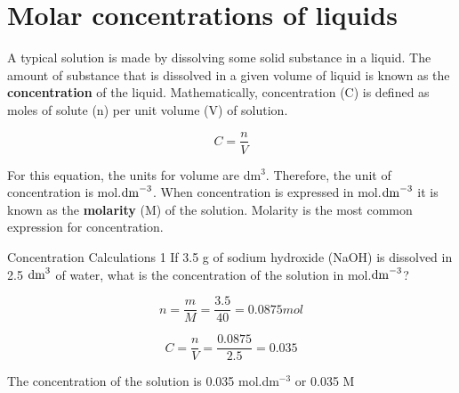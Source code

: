 



\section{Molar concentrations of liquids}
\label{sec:quant:liquids}


A typical solution is made by dissolving some solid substance in a liquid. The amount of substance that is dissolved in a given volume of liquid is known as the \textbf{concentration} of the liquid. Mathematically, concentration (C) is defined as moles of solute (n) per unit volume (V) of solution.

\begin{equation*}
C = \frac{n}{V}
\end{equation*}

For this equation, the units for volume are dm$^{3}$. Therefore, the unit of concentration is mol.$\rm{dm}^{-3}$.
When concentration is expressed in mol.$\rm{dm}^{-3}$ it is known as the \textbf{molarity} (M) of the solution. Molarity is the most common expression for concentration.



\begin{wex}{Concentration Calculations 1}{
If 3.5 g of sodium hydroxide (NaOH) is dissolved in 2.5 $\rm{dm}^{3}$ of water, what is the concentration of the solution in mol.$\rm{dm}^{-3}$?\\}

{

\begin{equation*}
n = \frac{m}{M} = \frac{3.5}{40} = 0.0875 mol
\end{equation*}


\begin{equation*}
C = \frac{n}{V} = \frac{0.0875}{2.5} = 0.035
\end{equation*}

The concentration of the solution is 0.035 mol.dm$^{-3}$ or 0.035 M
}
\end{wex}

